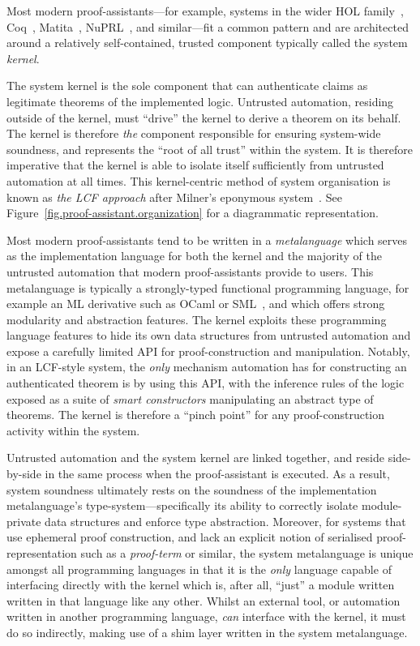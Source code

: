 \documentclass[a4paper, UKenglish, cleveref, autoref, thm-restate, colorlinks]{lipics-v2021}
\begin{document}
Most modern proof-assistants---for example, systems in the wider HOL family~\cite{10.1007/s00165-019-00492-1, DBLP:conf/tphol/Harrison09a, DBLP:conf/tphol/SlindN08}, Coq~\cite{DBLP:conf/popl/HuetH14}, Matita~\cite{DBLP:conf/cade/AspertiRCT11}, NuPRL~\cite{DBLP:conf/cade/AllenCEKL00}, and similar---fit a common pattern and are architected around a relatively self-contained, trusted component typically called the system \emph{kernel}.

The system kernel is the sole component that can authenticate claims as legitimate theorems of the implemented logic.
Untrusted automation, residing outside of the kernel, must ``drive'' the kernel to derive a theorem on its behalf.
The kernel is therefore \emph{the} component responsible for ensuring system-wide soundness, and represents the ``root of all trust'' within the system.
It is therefore imperative that the kernel is able to isolate itself sufficiently from untrusted automation at all times.
This kernel-centric method of system organisation is known as \emph{the LCF approach} after Milner's eponymous system~\cite{DBLP:books/sp/Gordon79}.
See Figure~\ref{fig.proof-assistant.organization} for a diagrammatic representation.

Most modern proof-assistants tend to be written in a \emph{metalanguage} which serves as the implementation language for both the kernel and the majority of the untrusted automation that modern proof-assistants provide to users.
This metalanguage is typically a strongly-typed functional programming language, for example an ML derivative such as OCaml or SML~\cite{DBLP:books/daglib/0069232}, and which offers strong modularity and abstraction features.
The kernel exploits these programming language features to hide its own data structures from untrusted automation and expose a carefully limited API for proof-construction and manipulation.
Notably, in an LCF-style system, the \emph{only} mechanism automation has for constructing an authenticated theorem is by using this API, with the inference rules of the logic exposed as a suite of \emph{smart constructors} manipulating an abstract type of theorems.
The kernel is therefore a ``pinch point'' for any proof-construction activity within the system.

Untrusted automation and the system kernel are linked together, and reside side-by-side in the same process when the proof-assistant is executed.
As a result, system soundness ultimately rests on the soundness of the implementation metalanguage's type-system---specifically its ability to correctly isolate module-private data structures and enforce type abstraction.
Moreover, for systems that use ephemeral proof construction, and lack an explicit notion of serialised proof-representation such as a \emph{proof-term} or similar, the system metalanguage is unique amongst all programming languages in that it is the \emph{only} language capable of interfacing directly with the kernel which is, after all, ``just'' a module written written in that language like any other.
Whilst an external tool, or automation written in another programming language, \emph{can} interface with the kernel, it must do so indirectly, making use of a shim layer written in the system metalanguage.
\end{document}
